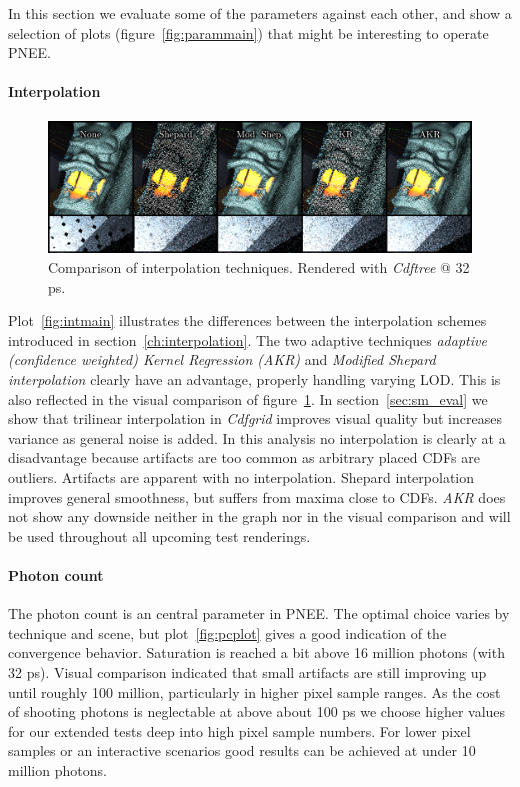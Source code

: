 In this section we evaluate some of the parameters against each other, and show a selection of plots (figure~\ref{fig:parammain}) that might be interesting to operate PNEE.

\paragraph{Interpolation}

\begin{figure}
    \centering
    \includegraphics[width=1\textwidth]{figures/comparisons/int_comp.pdf}
    \caption{Comparison of interpolation techniques. Rendered with \textit{Cdftree} @ 32 ps.}
    \label{fig:intcomp}
\end{figure}

Plot~\ref{fig:intmain} illustrates the differences between the interpolation schemes introduced in section~\ref{ch:interpolation}. The two adaptive techniques \textit{adaptive (confidence weighted) Kernel Regression (AKR)} and \textit{Modified Shepard interpolation} clearly have an advantage, properly handling varying LOD. This is also reflected in the visual comparison of figure~\ref{fig:intcomp}. In section~\ref{sec:sm_eval} we show that trilinear interpolation in \textit{Cdfgrid} improves visual quality but increases variance as general noise is added. In this analysis no interpolation is clearly at a disadvantage because artifacts are too common as arbitrary placed CDFs are outliers. Artifacts are apparent with no interpolation. Shepard interpolation improves general smoothness, but suffers from maxima close to CDFs. \textit{AKR} does not show any downside neither in the graph nor in the visual comparison and will be used throughout all upcoming test renderings.

\paragraph{Photon count}

The photon count is an central parameter in PNEE. The optimal choice varies by technique and scene, but plot~\ref{fig:pcplot} gives a good indication of the convergence behavior. Saturation is reached a bit above 16 million photons (with 32 ps). Visual comparison indicated that small artifacts are still improving up until roughly 100 million, particularly in higher pixel sample ranges. As the cost of shooting photons is neglectable at above about 100 ps we choose higher values for our extended tests deep into high pixel sample numbers. For lower pixel samples or an interactive scenarios good results can be achieved at under 10 million photons.

